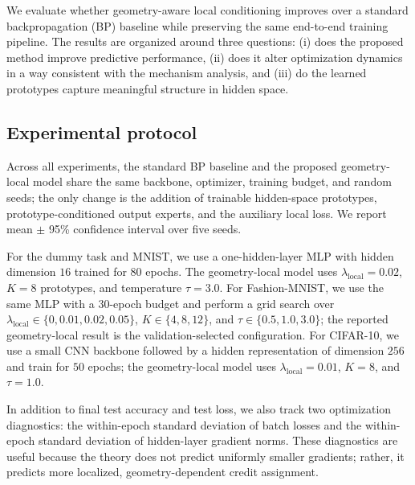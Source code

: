 \documentclass{article}
\theoremstyle{definition}
\theoremstyle{remark}
\begin{document}
We evaluate whether geometry-aware local conditioning improves over a standard backpropagation (BP) baseline while preserving the same end-to-end training pipeline. The results are organized around three questions: (i) does the proposed method improve predictive performance, (ii) does it alter optimization dynamics in a way consistent with the mechanism analysis, and (iii) do the learned prototypes capture meaningful structure in hidden space.

\subsection{Experimental protocol}
Across all experiments, the standard BP baseline and the proposed geometry-local model share the same backbone, optimizer, training budget, and random seeds; the only change is the addition of trainable hidden-space prototypes, prototype-conditioned output experts, and the auxiliary local loss. We report mean $\pm$ 95\% confidence interval over five seeds.

For the dummy task and MNIST, we use a one-hidden-layer MLP with hidden dimension $16$ trained for $80$ epochs. The geometry-local model uses $\lambda_{\mathrm{local}}=0.02$, $K=8$ prototypes, and temperature $\tau=3.0$. For Fashion-MNIST, we use the same MLP with a $30$-epoch budget and perform a grid search over $\lambda_{\mathrm{local}} \in \{0,0.01,0.02,0.05\}$, $K \in \{4,8,12\}$, and $\tau \in \{0.5,1.0,3.0\}$; the reported geometry-local result is the validation-selected configuration. For CIFAR-10, we use a small CNN backbone followed by a hidden representation of dimension $256$ and train for $50$ epochs; the geometry-local model uses $\lambda_{\mathrm{local}}=0.01$, $K=8$, and $\tau=1.0$.

In addition to final test accuracy and test loss, we also track two optimization diagnostics: the within-epoch standard deviation of batch losses and the within-epoch standard deviation of hidden-layer gradient norms. These diagnostics are useful because the theory does not predict uniformly smaller gradients; rather, it predicts more localized, geometry-dependent credit assignment.
\end{document}
